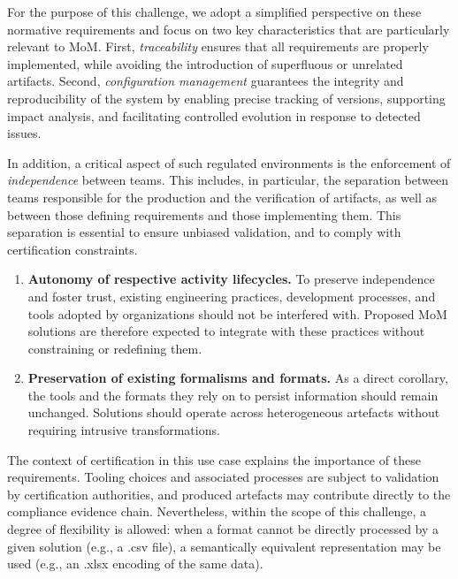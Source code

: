 \documentclass{article}
\begin{document}
For the purpose of this challenge, we adopt a simplified perspective on these
normative requirements and focus on two key characteristics that are particularly
relevant to MoM. First, \emph{traceability} ensures that all
requirements are properly implemented, while avoiding the introduction of
superfluous or unrelated artifacts. Second, \emph{configuration management}
guarantees the integrity and reproducibility of the system by enabling precise
tracking of versions, supporting impact analysis, and facilitating controlled
evolution in response to detected issues.

In addition, a critical aspect of such regulated environments is the enforcement
of \emph{independence} between teams. This includes, in particular, the separation
between teams responsible for the production and the verification of artifacts, as
well as between those defining requirements and those implementing them. This
separation is essential to ensure unbiased validation, and to comply with
certification constraints.

\begin{enumerate}[leftmargin=*]
	\item \textbf{Autonomy of respective activity lifecycles.} To preserve 
   independence and foster trust, existing engineering practices, development 
   processes, and tools adopted by organizations should not be interfered with. 
   Proposed MoM solutions are therefore expected to integrate with these practices 
   without constraining or redefining them.

   \item  \textbf{Preservation of existing formalisms and formats.} As a direct
   corollary, the tools and the formats they rely on to persist information 
   should remain unchanged. Solutions should operate across heterogeneous 
   artefacts without requiring intrusive transformations.
\end{enumerate}

The context of certification in this use case explains the importance of these
requirements. Tooling choices and associated processes are subject to validation
by certification authorities, and produced artefacts may contribute directly to
the compliance evidence chain. Nevertheless, within the scope of this challenge,
a degree of flexibility is allowed: when a format cannot be directly processed
by a given solution (e.g., a \textsf{.csv} file), a semantically equivalent
representation may be used (e.g., an \textsf{.xlsx} encoding of the same data).
\end{document}
